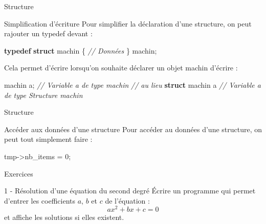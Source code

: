 \documentclass[
  10pt,
  french,
  ignorenonframetext,
  aspectratio=169,
]{beamer}
\newenvironment{Shaded}{}{}
\newcommand{\CommentTok}[1]{\textcolor[rgb]{0.38,0.63,0.69}{\textit{#1}}}
\newcommand{\DecValTok}[1]{\textcolor[rgb]{0.25,0.63,0.44}{#1}}
\newcommand{\KeywordTok}[1]{\textcolor[rgb]{0.00,0.44,0.13}{\textbf{#1}}}
\newcommand{\NormalTok}[1]{#1}
\newcommand{\OperatorTok}[1]{\textcolor[rgb]{0.40,0.40,0.40}{#1}}
\begin{document}
\begin{frame}[fragile]{Structure}
\protect\hypertarget{structure-1}{}
\begin{block}{Simplification d'écriture}
\protect\hypertarget{simplification-duxe9criture}{}
Pour simplifier la déclaration d'une structure, on peut rajouter un
typedef devant :

\begin{Shaded}
\begin{Highlighting}[]
\KeywordTok{typedef} \KeywordTok{struct}\NormalTok{ machin }\OperatorTok{\{}
    \CommentTok{// Données}
\OperatorTok{\}}\NormalTok{ machin}\OperatorTok{;}
\end{Highlighting}
\end{Shaded}

Cela permet d'écrire lorsqu'on souhaite déclarer un objet machin
d'écrire :

\begin{Shaded}
\begin{Highlighting}[]
\NormalTok{machin a}\OperatorTok{;} \CommentTok{// Variable a de type machin}
\CommentTok{// au lieu}
\KeywordTok{struct}\NormalTok{ machin a }\CommentTok{// Variable a de type Structure machin}
\end{Highlighting}
\end{Shaded}
\end{block}
\end{frame}

\begin{frame}[fragile]{Structure}
\protect\hypertarget{structure-2}{}
\begin{block}{Accéder aux données d'une structure}
\protect\hypertarget{accuxe9der-aux-donnuxe9es-dune-structure}{}
Pour accéder au données d'une structure, on peut tout simplement faire :

\begin{Shaded}
\begin{Highlighting}[]
\NormalTok{tmp}\OperatorTok{{-}\textgreater{}}\NormalTok{nb\_items }\OperatorTok{=} \DecValTok{0}\OperatorTok{;}
\end{Highlighting}
\end{Shaded}
\end{block}
\end{frame}

\begin{frame}{Exercices}
\protect\hypertarget{exercices}{}
\begin{block}{1 - Résolution d'une équation du second degré}
\protect\hypertarget{ruxe9solution-dune-uxe9quation-du-second-degruxe9}{}
Écrire un programme qui permet d'entrer les coefficients \(a\), \(b\) et
\(c\) de l'équation : \[ax^2 + bx + c = 0\] et affiche les solutions si
elles existent.
\end{block}
\end{frame}
\end{document}

